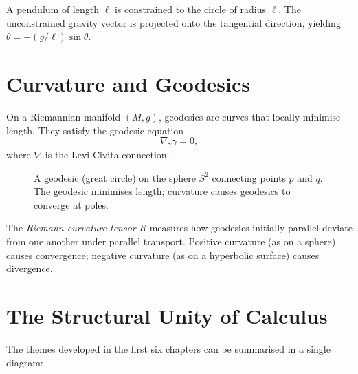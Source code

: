 \documentclass[12pt,openany]{book}
\begin{document}
\begin{example}[Pendulum]
  A pendulum of length $\ell$ is constrained to the circle of radius $\ell$.
  The unconstrained gravity vector is projected onto the tangential direction,
  yielding $\ddot\theta = -(g/\ell)\sin\theta$.
\end{example}

\section{Curvature and Geodesics}

On a Riemannian manifold $(M,g)$, geodesics are curves that locally minimise
length. They satisfy the geodesic equation
\[
  \nabla_{\dot\gamma}\dot\gamma = 0,
\]
where $\nabla$ is the Levi-Civita connection.

\begin{figure}[H]
\centering
{}
\caption{A geodesic (great circle) on the sphere $S^2$ connecting points $p$
and $q$. The geodesic minimises length; curvature causes geodesics to converge
at poles.}
\label{fig:geodesic}
\end{figure}

The \emph{Riemann curvature tensor} $R$ measures how geodesics initially
parallel deviate from one another under parallel transport. Positive curvature
(as on a sphere) causes convergence; negative curvature (as on a hyperbolic
surface) causes divergence.

\section{The Structural Unity of Calculus}

The themes developed in the first six chapters can be summarised in a single
diagram:
\end{document}
